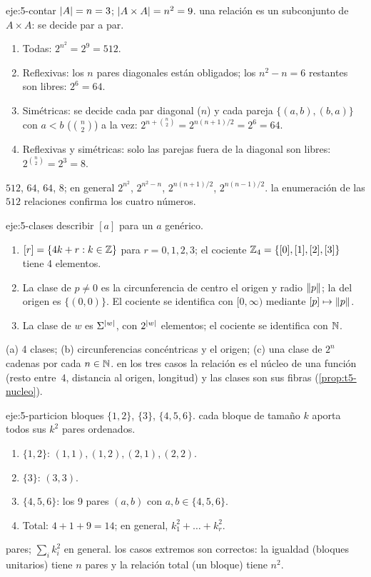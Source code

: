 \begin{solucion}{eje:5-contar}
\datos $\lvert A\rvert=n=3$; $\lvert A\times A\rvert=n^{2}=9$.
\planteamiento una relación es un subconjunto de $A\times A$: se decide par a par.
\pasos
\begin{enumerate}[label=\arabic*.]
  \item Todas: $2^{n^{2}}=2^{9}=512$.
  \item Reflexivas: los $n$ pares diagonales están obligados; los $n^{2}-n=6$ restantes son libres: $2^{6}=64$.
  \item Simétricas: se decide cada par diagonal ($n$) y cada pareja $\{(a,b),(b,a)\}$ con $a<b$ ($\binom n2$) a la vez: $2^{n+\binom n2}=2^{n(n+1)/2}=2^{6}=64$.
  \item Reflexivas y simétricas: solo las parejas fuera de la diagonal son libres: $2^{\binom n2}=2^{3}=8$.
\end{enumerate}
\resultado $512$, $64$, $64$, $8$; en general $2^{n^{2}}$, $2^{n^{2}-n}$, $2^{n(n+1)/2}$, $2^{n(n-1)/2}$.
\comprobacion la enumeración de las $512$ relaciones confirma los cuatro números.
\end{solucion}

\begin{solucion}{eje:5-clases}
\planteamiento describir $[a]$ para un $a$ genérico.
\pasos
\begin{enumerate}[label=(\alph*)]
  \item $[r]=\{4k+r:k\in\mathbb{Z}\}$ para $r=0,1,2,3$; el cociente $\mathbb{Z}_4=\{[0],[1],[2],[3]\}$ tiene 4 elementos.
  \item La clase de $p\neq0$ es la circunferencia de centro el origen y radio $\lVert p\rVert$; la del origen es $\{(0,0)\}$. El cociente se identifica con $[0,\infty)$ mediante $[p]\mapsto\lVert p\rVert$.
  \item La clase de $w$ es $\Sigma^{\lvert w\rvert}$, con $2^{\lvert w\rvert}$ elementos; el cociente se identifica con $\mathbb{N}$.
\end{enumerate}
\resultado (a) 4 clases; (b) circunferencias concéntricas y el origen; (c) una clase de $2^{n}$ cadenas por cada $n\in\mathbb{N}$.
\comprobacion en los tres casos la relación es el núcleo de una función (resto entre~4, distancia al origen, longitud) y las clases son sus fibras (\cref{prop:t5-nucleo}).
\end{solucion}

\begin{solucion}{eje:5-particion}
\datos bloques $\{1,2\}$, $\{3\}$, $\{4,5,6\}$.
\planteamiento cada bloque de tamaño $k$ aporta todos sus $k^{2}$ pares ordenados.
\pasos
\begin{enumerate}[label=\arabic*.]
  \item $\{1,2\}$: $(1,1),(1,2),(2,1),(2,2)$.
  \item $\{3\}$: $(3,3)$.
  \item $\{4,5,6\}$: los 9 pares $(a,b)$ con $a,b\in\{4,5,6\}$.
  \item Total: $4+1+9=14$; en general, $k_1^{2}+\dots+k_r^{2}$.
\end{enumerate}
 pares; $\sum_i k_i^{2}$ en general.
\comprobacion los casos extremos son correctos: la igualdad (bloques unitarios) tiene $n$ pares y la relación total (un bloque) tiene $n^{2}$.
\end{solucion}

